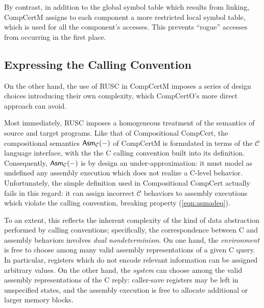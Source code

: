 \documentclass[sigplan,screen]{acmart}
\newenvironment{optional}{}{}
\begin{document}
\begin{optional}
By contrast,
in addition to the global symbol table which results from linking,
CompCertM assigns to each component
a more restricted local symbol table,
which is used for all the component's accesses.
This prevents ``rogue'' accesses
from occurring in the first place.


\subsection{Expressing the Calling Convention} %

On the other hand,
the use of RUSC in CompCertM imposes a series of design choices
introducing their own complexity,
which CompCertO's more direct approach can avoid.

Most immediately,
RUSC imposes a homogeneous
treatment of the semantics of source and target programs.
Like that of Compositional CompCert,
the compositional semantics $ \mathsf{Asm} _\mathcal{C}(-)$
of CompCertM
is formulated in terms of the $\mathcal{C}$ language interface,
with the the C calling convention built into its definition.
Consequently, $ \mathsf{Asm} _\mathcal{C}(-)$ is by design an under-approximation:
it must model as undefined any assembly execution
which does not realize a C-level behavior.
Unfortunately,
the simple definition used in Compositional CompCert
actually fails in this regard:
it can assign incorrect $\mathcal{C}$ behaviors
to assembly executions which violate the calling convention,
breaking property (\ref{eqn:asmadeq}).

To an extent,
this reflects the inherent complexity
of the kind of data abstraction performed by calling conventions;
specifically,
the correspondence between C and assembly behaviors
involves \emph{dual nondeterminism}.
On one hand,
the \emph{environment} is free to choose among
many valid assembly representations of a given C query.
In particular,
registers which do not encode relevant information
can be assigned arbitrary values.
On the other hand,
the \emph{system} can choose among
the valid assembly representations of the C reply:
caller-save registers may be left in unspecified states,
and the assembly execution is free
to allocate additional or larger memory blocks.


\end{optional}
\end{document}
